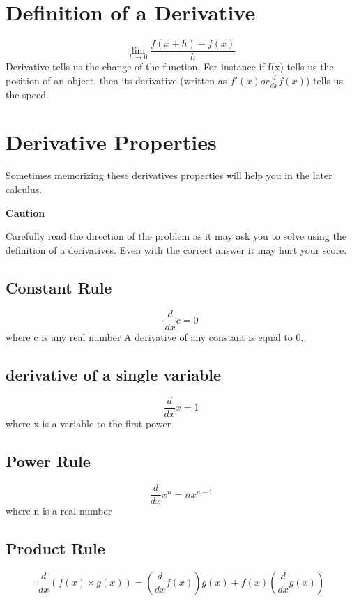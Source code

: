 \documentclass[12pt]{article}
\begin{document}
\section{Definition of a Derivative}
\begin{equation}
    \lim_{h\to0}\frac{f(x+h)-f(x)}{h}
\end{equation}
Derivative tells us the change of the function. \newline 
For instance if f(x) tells us the position of an object, then its derivative (written as $f'(x) or \frac{d}{dx}f(x)$) tells us the speed. 
\section{Derivative Properties}
Sometimes memorizing these derivatives properties will help you in the later calculus. 
\begin{center}
    \textbf{Caution}
\end{center}
Carefully read the direction of the problem as it may ask you to solve using 
the definition of a derivatives. Even with the correct answer it may hurt your score.   
\subsection{Constant Rule}
\begin{equation}
    \frac{d}{dx}c = 0
\end{equation} where c is any real number \newline
A derivative of any constant is equal to 0.
\subsection{derivative of a single variable}
\begin{equation}
    \frac{d}{dx}x = 1
\end{equation}
where x is a variable to the first power
\subsection{Power Rule}
\begin{equation}
    \frac{d}{dx}x^{n} = nx^{n-1}
\end{equation}
where n is a real number 
\subsection{Product Rule}
\begin{equation}
    \frac{d}{dx}(f(x)\times g(x)) = (\frac{d}{dx}f(x))g(x) + f(x)(\frac{d}{dx}g(x))
\end{equation}
\end{document}
